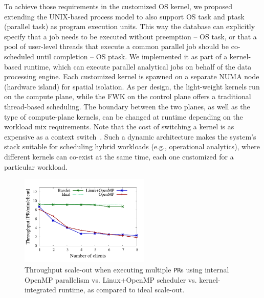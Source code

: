 \documentclass[11pt]{article}
\begin{document}
To achieve those requirements in the customized OS kernel, we proposed extending 
the UNIX-based process model to also support OS task and ptask (parallel task) 
as program execution units. This way the database can explicitly specify that a 
job needs to be executed without preemption -- OS task, or that a pool of 
user-level threads that execute a common parallel job should be co-scheduled 
until completion -- OS ptask. 
We implemented it as part of a kernel-based runtime, which can execute 
parallel analytical jobs on behalf of the data processing engine. Each customized
kernel is spawned on a separate NUMA node (hardware island) for spatial isolation.
As per design, the light-weight kernels run on the compute plane, while the
FWK on the control plane offers a traditional thread-based scheduling. The boundary 
between the two planes, as well as the type of compute-plane kernels, can be changed 
at runtime depending on the workload mix requirements. Note that the cost of switching a
kernel is as expensive as a context switch~\cite{zellweger:osdi14}. 
Such a dynamic architecture makes the system's stack suitable for scheduling 
hybrid workloads (e.g., operational analytics), where different kernels can 
co-exist at the same time, each one customized for a particular workload.

\begin{figure}[t]
\centering
\includegraphics[width=0.55\textwidth]{figs/PR_scale_out.pdf}
\caption[Comparing throughput scale-out using OpenMP vs. 
Linux+OpenMP vs. \Runtime]
{Throughput scale-out when executing multiple \texttt{PR}s
using internal OpenMP parallelism vs. Linux+OpenMP scheduler 
vs. kernel-integrated runtime, as compared to ideal scale-out.}
\label{fig:basslet_results}
\end{figure}
\end{document}
